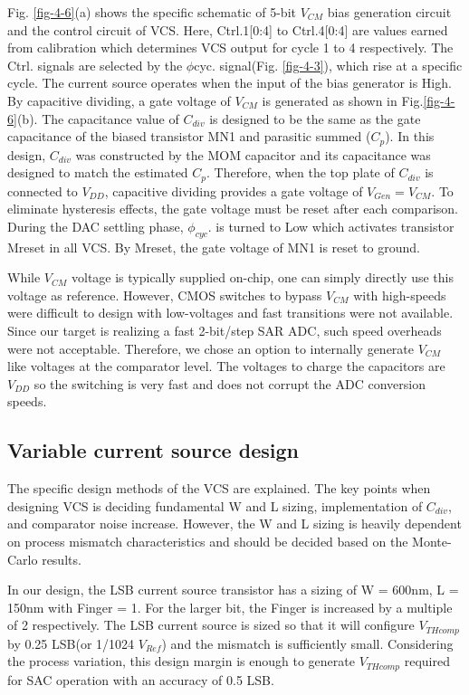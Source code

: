 Fig. \ref{fig-4-6}(a) shows the specific schematic of 5-bit $V_{CM}$ bias generation circuit and the control circuit of VCS. Here, Ctrl.1[0:4] to Ctrl.4[0:4] are values earned from calibration which determines VCS output for cycle 1 to 4 respectively. The Ctrl. signals are selected by the $\phi$cyc. signal(Fig. \ref{fig-4-3}), which rise at a specific cycle. The current source operates when the input of the bias generator is High. By capacitive dividing, a gate voltage of $V_{CM}$ is generated as shown in Fig.\ref{fig-4-6}(b). The capacitance value of $C_{div}$ is designed to be the same as the gate capacitance of the biased transistor MN1 and parasitic summed ($C_p$). In this design, $C_{div}$ was constructed by the MOM capacitor and its capacitance was designed to match the estimated $C_p$. Therefore, when the top plate of $C_{div}$ is connected to $V_{DD}$, capacitive dividing provides a gate voltage of $V_{Gen}=V_{CM}$. To eliminate hysteresis effects, the gate voltage must be reset after each comparison. During the DAC settling phase, $\phi_{cyc}$. is turned to Low which activates transistor Mreset in all VCS. By Mreset, the gate voltage of MN1 is reset to ground.

While $V_{CM}$ voltage is typically supplied on-chip, one can simply directly use this voltage as reference. 
However, CMOS switches to bypass $V_{CM}$ with high-speeds were difficult to design with low-voltages and fast transitions were not available. Since our target is realizing a fast 2-bit/step SAR ADC, such speed overheads were not acceptable.
Therefore, we chose an option to internally generate $V_{CM}$ like voltages at the comparator level. The voltages to charge the capacitors are $V_{DD}$ so the switching is very fast and does not corrupt the ADC conversion speeds.

\subsection{Variable current source design}

The specific design methods of the VCS are explained. The key points when designing VCS is deciding fundamental W and L sizing, implementation of $C_{div}$, and comparator noise increase. However, the W and L sizing is heavily dependent on process mismatch characteristics and should be decided based on the Monte-Carlo results.

In our design, the LSB current source transistor has a sizing of W = 600nm, L = 150nm with Finger = 1. For the larger bit, the Finger is increased by a multiple of 2 respectively. The LSB current source is sized so that it will configure $V_{THcomp}$ by 0.25 LSB(or 1/1024 $V_{Ref}$) and the mismatch is sufficiently small. Considering the process variation, this design margin is enough to generate $V_{THcomp}$ required for SAC operation with an accuracy of 0.5 LSB.

